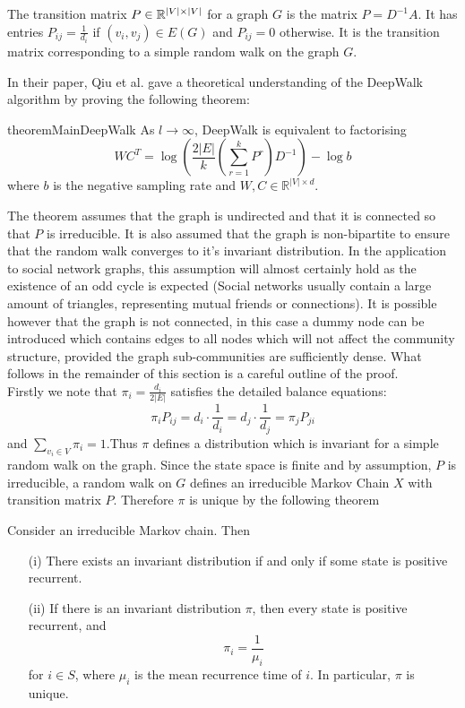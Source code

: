 \documentclass[a4paper]{article}
\begin{document}
\begin{definition}
  The transition matrix $P \in \R^{|V| \times |V|}$ for a graph $G$ is the
  matrix $P = D^{-1}A$. It has entries $P_{ij} = \frac{1}{d_i}$ if $(v_i, v_j)
  \in E(G)$ and $P_{ij} = 0$ otherwise. It is the transition matrix
  corresponding to a simple random walk on the graph $G$. 
\end{definition}
In their paper, Qiu et al. gave a theoretical understanding of the DeepWalk
algorithm by proving the following theorem:
\begin{restatable}{theorem}{MainDeepWalk}
  As $l \to \infty$, DeepWalk is equivalent to factorising
  \[WC^T = \log{\left(\frac{2|E|}{k}\left( \sum_{r = 1}^k P^r  \right) D^{-1}
      \right)} - \log{b}\]
  where $b$ is the negative sampling rate and $W, C \in \mathbb{R}^{|V| \times d}$.
\end{restatable}
\noindent The theorem assumes that the graph is undirected and that it is connected so
that $P$ is irreducible. It is also assumed that the graph is
non-bipartite to ensure that the random walk converges to it's invariant distribution. In the application to
social network graphs, this
assumption will almost certainly hold as the existence of an odd cycle is
expected (Social networks usually contain a large amount of triangles,
representing mutual friends or connections). It is possible however that the
graph is not connected, in this case a dummy node can be introduced which
contains edges to all nodes which will not affect the community structure,
provided the graph sub-communities are sufficiently dense.
What follows in the remainder of this section is a careful outline of the proof.\\
Firstly we note that $\pi_i = \frac{d_i}{2|E|}$ satisfies the detailed balance equations:
\[\pi_i P_{ij} = d_i\cdot \frac{1}{d_i} = d_j \cdot \frac{1}{d_j} = \pi_j P_{ji}\]
and $\sum_{v_i \in V} \pi_i = 1$.Thus $\pi$ defines a distribution which is
invariant for a simple random walk on the graph. Since the state space is
finite and by assumption, $P$ is irreducible, a random walk on $G$ defines an
irreducible Markov Chain $X$ with transition matrix $P$. Therefore $\pi$ is
unique by the following theorem
\begin{theorem}
  Consider an irreducible Markov chain. Then
  \begin{itemize}
  \item[(i)] There exists an invariant distribution if and only if some state is
    positive recurrent.
  \item[(ii)] If there is an invariant distribution $\pi$, then every state is
    positive recurrent, and
    \[\pi_i = \frac{1}{\mu_i}\]
    for $i \in S$, where $\mu_i$ is the mean recurrence time of $i$. In
    particular, $\pi$ is unique.
  \end{itemize}
\end{theorem}
\end{document}
